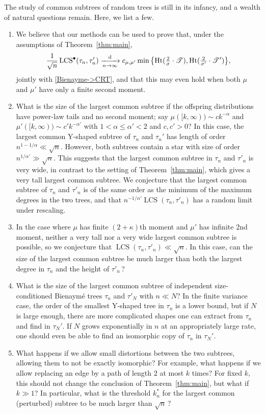 \documentclass[11pt,reqno]{amsart}
\newcommand{\Ht}{\mathrm{Ht}}
\newcommand{\LCS}{\operatorname{LCS}}
\begin{document}
The study of common subtrees of random trees is still in its infancy, and a wealth of natural  questions remain. Here, we list a few. 

\begin{enumerate}
    \item We believe that our methods can be used to prove that, under the assumptions of Theorem~\ref{thm:main},
    \[\frac{1}{\sqrt{n}}\LCS^\bullet(\tau_n,\tau_n') \xrightarrow[n\to\infty]{\mathrm d} c_{\mu,\mu'}\min\big\{\Ht(\tfrac{2}{\sigma}\cdot\sT),\Ht(\tfrac{2}{\sigma'}\cdot\sT')\big\},\]
    jointly with \eqref{Bienayme->CRT},
    and that this may even hold when both $\mu$ and $\mu'$ have only a finite second moment. 
    \item What is the size of the largest common subtree if the offspring distributions have power-law tails and no second moment; say $\mu([k,\infty))\sim c k^{-\alpha}$  and $\mu'([k,\infty))\sim c'k^{-\alpha'}$ with $1<\alpha\le \alpha'<2$ and $c,c'>0$? In this case, the largest common Y-shaped subtree of $\tau_n$ and $\tau_n'$ has length of order $n^{1-1/\alpha}\ll \sqrt{n}$. However, both subtrees contain a star with size of order $n^{1/\alpha'}\gg \sqrt{n}$. This suggests that the largest common subtree in $\tau_n$ and $\tau'_n$ is very wide, in contrast to the setting of Theorem~\ref{thm:main}, which gives a very tall largest common subtree. We conjecture that the largest common subtree of $\tau_n$ and $\tau'_n$ is of the same order as the minimum of the maximum degrees in the two trees, and that $n^{-1/\alpha'}\LCS(\tau_n,\tau'_n)$ has a random limit under rescaling. 
    \item In the case where $\mu$ has finite $(2+\kappa)$th moment and $\mu'$ has infinite $2$nd moment, neither a very tall nor a very wide largest common subtree is possible, so we conjecture that $\LCS(\tau_n,\tau'_n)\ll\sqrt{n}$. In this case, can the size of the largest common subtree be much larger than both the largest degree in $\tau_n$ and the height of $\tau'_n$\,?  
    \item What is the size of the largest common subtree of independent size-conditioned Bienaymé trees $\tau_n$ and $\tau'_N$ with $n\ll N$? In the finite variance case, the order of the smallest Y-shaped tree in $\tau_n$ is a lower bound, but if $N$ is large enough, there are more complicated shapes one can extract from $\tau_n$ and find in $\tau_N'$. If $N$ grows exponentially in $n$ at an appropriately large rate, one should even be able to find an isomorphic copy of $\tau_n$ in $\tau_N'$. 
    \item What happens if we allow small distortions between the two subtrees, allowing them to not be exactly isomorphic? For example, what happens if we allow replacing an edge by a path of length $2$ at most $k$ times? For fixed $k$, this should not change the conclusion of Theorem~\ref{thm:main}, but what if $k\gg1$? In particular, what is the threshold $k^*_n$ for the largest common (perturbed) subtree to be much larger than $\sqrt{n}$\,?

\end{enumerate}
\end{document}
